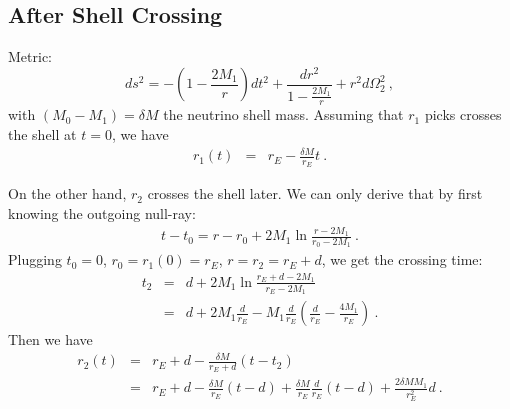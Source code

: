 \documentclass[12pt,letterpaper]{JHEP3}
\begin{document}
\subsection{After Shell Crossing}

Metric:
\begin{equation}
ds^2 = -\left(1-\frac{2M_{1}}{r}\right)dt^2 + \frac{dr^2}{1-\frac{2M_{1}}{r}}+r^2d\Omega_2^2~,
\end{equation}
with $(M_{0}-M_{1})=\delta M$ the neutrino shell mass. Assuming that $r_1$ picks crosses the shell at $t=0$, we have
\begin{eqnarray}
r_1(t) &=& r_E - \frac{\delta M}{r_E}t~.
\end{eqnarray}

On the other hand, $r_2$ crosses the shell later. We can only derive that by first knowing the outgoing null-ray:
\begin{eqnarray}
t-t_0 = r-r_0 + 2M_{1}\ln\frac{r-2M_{1}}{r_0-2M_{1}}~.
\label{eq-null1out}
\end{eqnarray}
Plugging $t_0=0$, $r_0 = r_1(0) = r_E$, $r = r_2 = r_E+d$, we get the crossing time:
\begin{eqnarray}
t_2 &=& d + 2M_1\ln \frac{r_E+d-2M_1}{r_E-2M_1} \\ \nonumber
&=& d + 2M_1\frac{d}{r_E} - M_1\frac{d}{r_E}\left( \frac{d}{r_E} - \frac{4M_1}{r_E} \right)~.
\end{eqnarray}
Then we have
\begin{eqnarray}
r_2(t) &=& r_E + d - \frac{\delta M}{r_E+d}(t-t_2)
\\ \nonumber
&=& r_E + d - \frac{\delta M}{r_E}(t-d) + \frac{\delta M}{r_E}\frac{d}{r_E}(t-d)
+\frac{2\delta M M_1}{r_E^2}d~.
\end{eqnarray}
\end{document}
